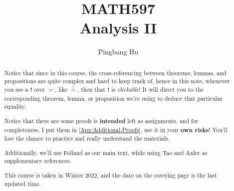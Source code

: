 \documentclass[a4paper]{report}
\author{Pingbang Hu}
\title{MATH597\\Analysis II}
\begin{document}
\maketitle

\begin{abstract}
	Notice that since in this course, the cross-referencing between theorems, lemmas, and propositions are quite complex and
	hard to keep track of, hence in this note, whenever you see a \textbf{!} over \(=\), like \(\overset{!}{=}\), then that
	\textbf{!} is \emph{clickable}! It will direct you to the corresponding theorem, lemma, or proposition we're using to deduce that particular
	equality.

	\par Notice that there are some proofs is \textbf{intended} left as assignments, and for completeness, I put them in \autoref{Apx:Additional-Proofs},
	use it in your \textbf{own risks}! You'll lose the chance to practice and really understand the materials.

	\par Additionally, we'll use Folland\cite{folland1999real} as our main text, while using Tao\cite{tao2013introduction} and Axler\cite{axler2019measure}
	as supplementary references.

	\par This course is taken in Winter 2022, and the date on the covering page is the last updated time.
\end{abstract}

\tableofcontents


\newpage
\appendix
\appendixpage



\newpage
\printbibliography
\end{document}
